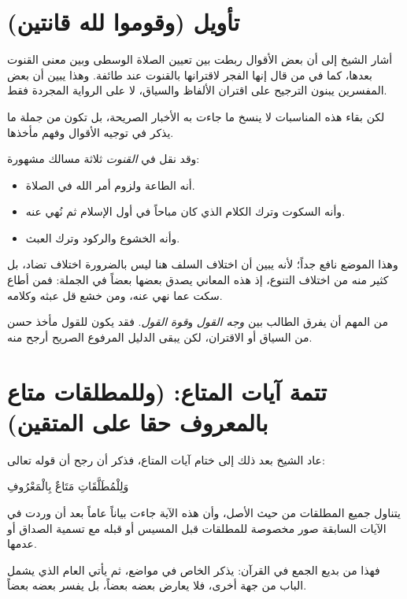 \separator

\section{تأويل (وقوموا لله قانتين)}
أشار الشيخ إلى أن بعض الأقوال ربطت بين تعيين الصلاة الوسطى وبين معنى القنوت بعدها، كما في من قال إنها الفجر لاقترانها بالقنوت عند طائفة. وهذا يبين أن بعض المفسرين يبنون الترجيح على اقتران الألفاظ والسياق، لا على الرواية المجردة فقط.

لكن بقاء هذه المناسبات لا ينسخ ما جاءت به الأخبار الصريحة، بل تكون من جملة ما يذكر في توجيه الأقوال وفهم مأخذها.

وقد نقل  في \textit{القنوت} ثلاثة مسالك مشهورة:
\begin{itemize}
    \item أنه الطاعة ولزوم أمر الله في الصلاة.
    \item وأنه السكوت وترك الكلام الذي كان مباحاً في أول الإسلام ثم نُهي عنه.
    \item وأنه الخشوع والركود وترك العبث.
\end{itemize}

وهذا الموضع نافع جداً؛ لأنه يبين أن اختلاف السلف هنا ليس بالضرورة اختلاف تضاد، بل كثير منه من اختلاف التنوع، إذ هذه المعاني يصدق بعضها بعضاً في الجملة: فمن أطاع سكت عما نهي عنه، ومن خشع قل عبثه وكلامه.

\begin{fawaid}
من المهم أن يفرق الطالب بين \textit{وجه القول} و\textit{قوة القول}. فقد يكون للقول مأخذ حسن من السياق أو الاقتران، لكن يبقى الدليل المرفوع الصريح أرجح منه.
\end{fawaid}

\separator

\section{تتمة آيات المتاع: (وللمطلقات متاع بالمعروف حقا على المتقين)}
عاد الشيخ بعد ذلك إلى ختام آيات المتاع، فذكر أن  رجح أن قوله تعالى: \begin{ayah}وَلِلْمُطَلَّقَاتِ مَتَاعٌ بِالْمَعْرُوفِ\end{ayah} يتناول جميع المطلقات من حيث الأصل، وأن هذه الآية جاءت بياناً عاماً بعد أن وردت في الآيات السابقة صور مخصوصة للمطلقات قبل المسيس أو قبله مع تسمية الصداق أو عدمها.

فهذا من بديع الجمع في القرآن: يذكر الخاص في مواضع، ثم يأتي العام الذي يشمل الباب من جهة أخرى، فلا يعارض بعضه بعضاً، بل يفسر بعضه بعضاً.

